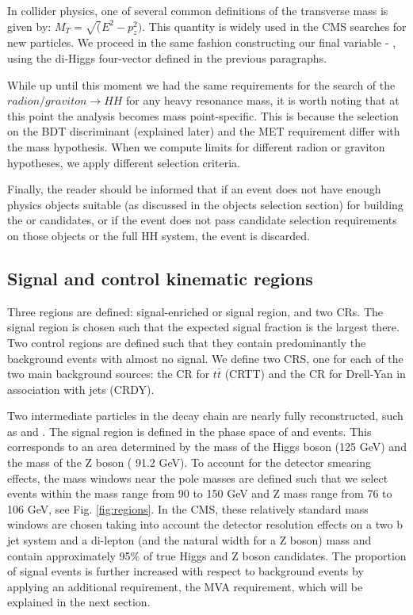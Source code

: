 In collider physics, one of several common definitions of the transverse mass is given by:
$M_T=\sqrt( E^2- p_z^2)$. This quantity is widely used in the CMS searches for new particles. We proceed in the same fashion constructing our final variable - \mTHH, using the di-Higgs four-vector defined in the previous paragraphs. 

While up until this moment we had the same requirements for the search of the $radion/graviton \to HH$ for any heavy resonance mass, it is worth noting that at this point the analysis becomes mass point-specific. This is because the selection on the BDT discriminant (explained later) and the MET requirement differ with the mass hypothesis. When we compute limits for different radion or graviton hypotheses, we apply different selection criteria. 

Finally, the reader should be informed that if an event does not have enough physics objects suitable (as discussed in the objects selection section) for building the \Zll or \HBB candidates, or if the event does not pass candidate selection requirements on those objects or the full HH system, the event is discarded.

\subsection{Signal and control kinematic regions}

Three regions are defined: signal-enriched or signal region, and two CRs. The signal region is chosen such that the expected signal fraction is the largest there. Two control regions are defined such that they contain predominantly the background events with almost no signal. We define two CRS, one for each of the two main background sources: the CR for $t\bar{t}$ (CRTT) and the CR for Drell-Yan in association with jets (CRDY).

Two intermediate particles in the decay chain are nearly fully reconstructed, such as \HBB and \Zll. The signal region is defined in the phase space of \HBB and \Zll events. This corresponds to an area determined by the mass of the Higgs boson (125 GeV) and the mass of the Z boson ( 91.2 GeV). To account for the detector smearing effects, the mass windows near the pole masses are defined such that we select events within the \HBB mass range from 90 to 150 GeV and Z mass range from 76 to 106 GeV, see Fig. \ref{fig:regions}. In the CMS, these relatively standard  mass windows are chosen taking into account the detector resolution effects on a two b jet system and a di-lepton (and the natural width for a Z boson) mass and contain approximately 95$\%$ of true Higgs and Z boson candidates. The proportion of signal events is further increased with respect to background events by applying an additional requirement, the MVA requirement, which will be explained in the next section.

